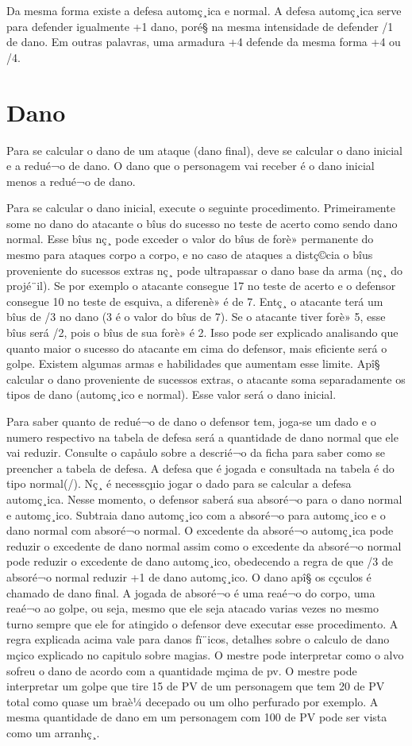 	Da mesma forma existe a defesa automç¸ica e normal. A defesa automç¸ica serve para defender igualmente +1 dano, poré§ na mesma intensidade de defender /1 de dano. Em outras palavras, uma armadura +4 defende da mesma forma +4 ou /4.
	
\section{Dano}

Para se calcular o dano de um ataque (dano final), deve se calcular o dano inicial e a redué¬o de dano. O dano que o personagem vai receber é o dano inicial menos a redué¬o de dano. 

Para se calcular o dano inicial, execute o seguinte procedimento. Primeiramente some no dano do atacante o bîus do sucesso no teste de acerto como sendo dano normal. Esse bîus nç¸ pode exceder o valor do bîus de forè» permanente do mesmo para ataques corpo a corpo, e no caso de ataques a distç©cia o bîus proveniente do sucessos extras nç¸ pode ultrapassar o dano base da arma (nç¸ do projé¨il). Se por exemplo o atacante consegue 17 no teste de acerto e o defensor consegue 10 no teste de esquiva, a diferenè» é de 7. Entç¸ o atacante terá um bîus de /3 no dano (3 é o valor do bîus de 7). Se o atacante tiver forè» 5, esse bîus será /2, pois o bîus de sua forè» é 2. Isso pode ser explicado analisando que quanto maior o sucesso do atacante em cima do defensor, mais eficiente será o golpe. Existem algumas armas e habilidades que aumentam esse limite. Apî§ calcular o dano proveniente de sucessos extras, o atacante soma separadamente os tipos de dano (automç¸ico e normal). Esse valor será o dano inicial.
	
Para saber quanto de redué¬o de dano o defensor tem, joga-se um dado e o numero respectivo na tabela de defesa será a quantidade de dano normal que ele vai reduzir. Consulte o capåulo sobre a descrié¬o da ficha para saber como se preencher a tabela de defesa. A defesa que é jogada e consultada na tabela é do tipo normal(/).  Nç¸ é necessçµio jogar o dado para se calcular a defesa automç¸ica.  Nesse momento, o defensor saberá sua absoré¬o para o dano normal e automç¸ico.
Subtraia dano automç¸ico com a absoré¬o para automç¸ico e o dano normal com absoré¬o normal. O excedente da absoré¬o automç¸ica pode reduzir o excedente de dano normal assim como o excedente da absoré¬o normal pode reduzir o excedente de dano automç¸ico, obedecendo a regra de que /3 de absoré¬o normal reduzir +1 de dano automç¸ico.  O dano apî§ os cçculos é chamado de dano final.
A jogada de absoré¬o é uma reaé¬o do corpo, uma reaé¬o ao golpe, ou seja, mesmo que ele seja atacado varias vezes no mesmo turno sempre que ele for atingido o defensor deve executar esse procedimento. A regra explicada acima vale para danos fï¨icos, detalhes sobre o calculo de dano mçico explicado no capitulo sobre magias.
	O mestre pode interpretar como o alvo sofreu o dano de acordo com a quantidade mçima de pv. O mestre pode interpretar um golpe que tire 15 de PV de um personagem que tem 20 de PV total como quase um braè¼ decepado ou um olho perfurado por exemplo. A mesma quantidade de dano em um personagem com 100 de PV pode ser vista como um arranhç¸.

